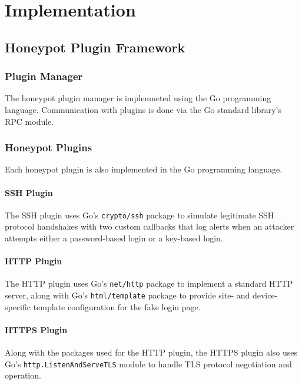 \chapter{Implementation}

\section{Honeypot Plugin Framework}

\subsection{Plugin Manager}

The honeypot plugin manager is implemneted using the Go programming language.
Communication with plugins is done via the Go standard library's RPC module.

\subsection{Honeypot Plugins}

Each honeypot plugin is also implemented in the Go programming language.

\subsubsection{SSH Plugin}

The SSH plugin uses Go's \texttt{crypto/ssh} package to simulate legitimate SSH
protocol handshakes with two custom callbacks that log alerts when an attacker
attempts either a password-based login or a key-based login.

\subsubsection{HTTP Plugin}

The HTTP plugin uses Go's \texttt{net/http} package to implement a standard HTTP
server, along with Go's \texttt{html/template} package to provide site- and
device-specific template configuration for the fake login page.

\subsubsection{HTTPS Plugin}

Along with the packages used for the HTTP plugin, the HTTPS plugin also uses
Go's \texttt{http.ListenAndServeTLS} module to handle TLS protocol negotiation
and operation.


